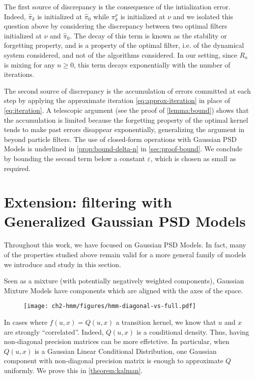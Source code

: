 The first source of discrepancy is the consequence of the intialization error. Indeed, $\hat\pi_k$ is initialized at $\hat \pi_0$ while $\pi_k^\nu$ is initialized at $\nu$ and we isolated this question above by considering the discrepancy between two optimal filters initialized at $\nu$ and $\hat \pi_0$. The decay of this term is known as the stability or forgetting property, and is a property of the optimal filter, i.e. of the dynamical system considered, and not of the algorithms considered. In our setting, since $R_n$ is mixing for any $n\geq 0$, this term decays exponentially with the number of iterations.

The second source of discrepancy is the accumulation of errors committed at each step by applying the approximate iteration \cref{eq:approx-iteration} in place of \cref{eq:iteration}. A telescopic argument (see the proof of \cref{lemma:bound}) shows that the accumulation is limited because the forgetting property of the optimal kernel tends to make past errors disappear exponentially, generalizing the argument in \cite{oudjane} beyond particle filters. The use of closed-form operations with Gaussian PSD Models is underlined in \cref{prop:bound-delta-n} in \cref{sec:proof-bound}. We conclude by bounding the second term below a constant $\varepsilon$, which is chosen as small as required.

\section{Extension: filtering with Generalized Gaussian PSD Models}\label{sec:generalized-psd-models}
Throughout this work, we have focused on Gaussian PSD Models. In fact, many of the properties studied above remain valid for a more general family of models we introduce and study in this section.

Seen as a mixture (with potentially negatively weighted components), Gaussian Mixture Models have components which are aligned with the axes of the space.
\begin{figure}[ht!]
\texttt{[image: ch2-hmm/figures/hmm-diagonal-vs-full.pdf]}
\end{figure}
In cases where $f(u, x) = Q(u, x)$ a transition kernel, we know that $u$ and $x$ are strongly ``correlated''. Indeed, $Q(u, x)$ is a conditional density. Thus, having non-diagonal precision matrices can be more effetctive. In particular, when $Q(u, x)$ is a Gaussian Linear Conditional Distribution, one Gaussian component with non-diagonal precision matrix is enough to approximate $Q$ uniformly. We prove this in \cref{theorem:kalman}.

